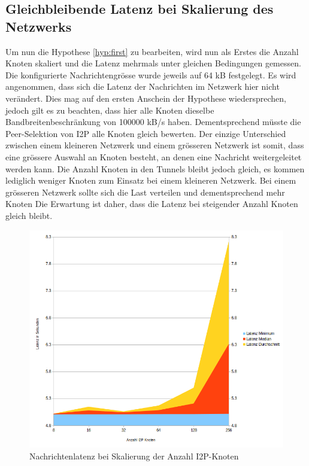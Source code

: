 \subsection{Gleichbleibende Latenz bei Skalierung des Netzwerks}\label{sec:messung_latenz}

Um nun die Hypothese \ref{hyp:first} zu bearbeiten, wird nun als Erstes die Anzahl Knoten skaliert
und die Latenz mehrmals unter gleichen Bedingungen gemessen.
Die konfigurierte Nachrichtengrösse wurde jeweils auf 64 kB festgelegt.
Es wird angenommen, dass sich die Latenz der Nachrichten im Netzwerk hier nicht verändert.
Dies mag auf den ersten Anschein der Hypothese wiedersprechen, jedoch gilt es zu beachten, dass hier alle Knoten dieselbe Bandbreitenbeschränkung von 100000 kB/s haben.
Dementsprechend müsste die Peer-Selektion von I2P alle Knoten gleich bewerten.
Der einzige Unterschied zwischen einem kleineren Netzwerk und einem grösseren Netzwerk ist somit,
dass eine grössere Auswahl an Knoten besteht, an denen eine Nachricht weitergeleitet werden kann.
Die Anzahl Knoten in den Tunnels bleibt jedoch gleich, es kommen lediglich weniger Knoten zum Einsatz bei einem kleineren Netzwerk.
Bei einem grösseren Netzwerk sollte sich die Last verteilen und dementsprechend mehr Knoten 
Die Erwartung ist daher, dass die Latenz bei steigender Anzahl Knoten gleich bleibt.

\begin{figure}[htp]
  \includegraphics[width=1.1\textwidth]{img/auswertung-latenz.png}
  \caption{Nachrichtenlatenz bei Skalierung der Anzahl I2P-Knoten}\label{fig:auswertung-latenz}
\end{figure}


